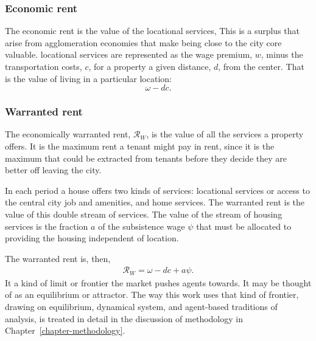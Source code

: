 \subsubsection{Economic rent} \label{section-economic-rent}
The economic rent is the value of the locational services, 
This is a surplus that arise from agglomeration economies that make being close to the city core valuable. \Gls{locational services} are represented as %
the wage premium, $w$, minus the transportation costs, $c$, for a property a given distance, $d$, from the center. That is the value of living in a particular location:
\[\omega- {dc}.\]

\subsubsection{Warranted rent} \label{section-waranted-rent}

The economically \gls{warranted rent}, $\mathcal{R}_W$, is the value of all  the services a property offers. %
It is the maximum rent a tenant might pay in rent, since it is the maximum that could be extracted from tenants before they decide they are better off leaving the city.  

In each period a house offers two kinds of services: {locational services} or  access to the central city job and amenities, and {home services}.  The {warranted rent} is the value of this double stream of services.  The value of the stream of housing services is the fraction $a$ of the subsistence wage $\psi$ that must be allocated to providing the housing independent of location. 

 The warranted rent is, then, 
\begin{align}
\mathcal{R}_W=\omega - {dc} + a\psi.
\label{eqn-warranted-rent}
\end{align}
 It a kind of limit or \gls{frontier} the market pushes agents towards. It may be thought of as an \gls{equilibrium} or \gls{attractor}. The way this work uses that kind of frontier, drawing on \gls{equilibrium}, \gls{dynamical system}, and \gls{agent-based} traditions of analysis, is treated in detail in the discussion of methodology in Chapter~\ref{chapter-methodology}.

